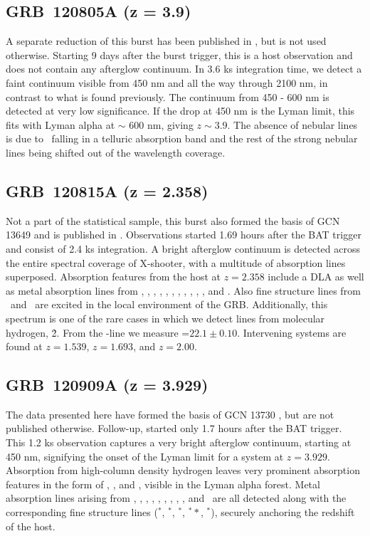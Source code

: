 \documentclass[longauth]{aa}    %
\begin{document}
\subsection{GRB~120805A (z = 3.9)} \label{120805}

A separate reduction of this burst has been published in \citet{Kruhler2015},
but is not used otherwise. Starting 9 days after the burst trigger, this is a host
observation and does not contain any afterglow continuum. In 3.6 ks integration
time, we detect a faint continuum visible from 450 nm and all the way through
2100 nm, in contrast to what is found previously. The continuum from 450 - 600
nm is detected at very low significance. If the drop at 450 nm is the Lyman
limit, this fits with Lyman alpha at $\sim$ 600 nm, giving $z \sim 3.9$. The
absence of nebular lines is due to \oii~falling in a telluric absorption band
and the rest of the strong nebular lines being shifted out of the wavelength coverage.

\subsection{GRB~120815A (z = 2.358)} \label{120815}

Not a part of the statistical sample, this burst also formed the basis of GCN
13649 \citep{GCN13649} and is published in \citet{Kruhler2013}. Observations
started 1.69 hours after the BAT trigger and consist of 2.4 ks integration. A
bright afterglow continuum is detected across the entire spectral coverage of
X-shooter, with a multitude of absorption lines superposed. Absorption features
from the host at $z = 2.358$ include a DLA as well as metal absorption lines
from \nv, \sii, \SIii, \oi, \civ, \SIiv, \feii, \alii, \aliii, \mnii, \mgii, and
\mgi. Also fine structure lines from \NIii~and \feii~are excited in the local
environment of the GRB. Additionally, this spectrum is one of the rare cases in
which we detect lines from molecular hydrogen, \h2. From the \lya-line we
measure \nh=$22.1\pm0.10$. Intervening systems are found at $z = 1.539$, $z =
1.693$, and $z = 2.00$.

\subsection{GRB~120909A (z = 3.929)} \label{120909}

The data presented here have formed the basis of GCN 13730 \citep{GCN13730}, but
are not published otherwise. Follow-up, started only 1.7 hours after the BAT
trigger. This 1.2 ks observation captures a very bright afterglow continuum,
starting at 450 nm, signifying the onset of the Lyman limit for a system at $z =
3.929$. Absorption from high-column density hydrogen leaves very prominent
absorption features in the form of \lya, \lyb, and \lyg, visible in the Lyman
alpha forest. Metal absorption lines arising from \feii, \NIii, \SIii, \sii,
\alii, \aliii, \cii, \oi, \civ, and \znii~are all detected along with the
corresponding fine structure lines (\feii$^*$, \SIii$^*$, \oi$^*$, \oi$^**$,
\cii$^*$), securely anchoring the redshift of the host.
\end{document}
